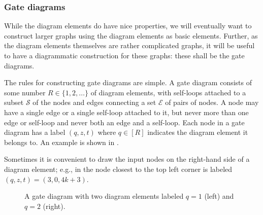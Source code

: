 \documentclass[../thesis-main/thesis-main]{subfiles}
\begin{document}
\subsubsection{Gate diagrams}\label{sec:gate_diagrams}

While the diagram elements do have nice properties, we will eventually want to construct larger graphs using the diagram elements as basic elements.  Further, as the diagram elements themselves are rather complicated graphs, it will be useful to have a diagrammatic construction for these graphs:  these shall be the gate diagrams.

The rules for constructing gate diagrams are simple. A gate diagram consists of some number $R \in \{1,2,\ldots\}$ of diagram elements, with self-loops attached to a subset $\mathcal{S}$ of the nodes and edges connecting a set $\mathcal{E}$ of pairs of nodes. A node may have a single edge or a single self-loop attached to it, but never more than one edge or self-loop and never both an edge and a self-loop. Each node in a gate diagram has a label $(q,z,t)$ where $q \in [R]$ indicates the diagram element it belongs to. An example is shown in .

Sometimes it is convenient to draw the input nodes on the right-hand side of a diagram element; e.g., in  the node closest to the top left corner is labeled $(q,z,t)=(3,0,4k+3)$.

\begin{figure}
\centering 
{}

\caption{A gate diagram with two diagram elements labeled $q=1$ (left) and $q=2$ (right).
\label{fig:simple_gate_diagram}}
\end{figure}
\end{document}
